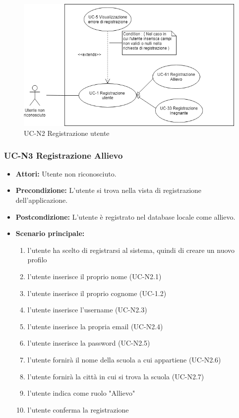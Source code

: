 \begin{figure}[h]
	\centering
	\includegraphics[scale=0.7]{images/UC-1.png}
	\caption{UC-N2 Registrazione utente}
\end{figure}

\subsubsection{UC-N3 Registrazione Allievo}
\begin{itemize}
	\item \textbf{Attori: }Utente non riconosciuto.
	\item \textbf{Precondizione: }L'utente si trova nella vista di registrazione dell'applicazione.
	\item \textbf{Postcondizione: }L'utente è registrato nel database locale come allievo.
	\item \textbf{Scenario principale: }
		\begin{enumerate}
		\item l'utente ha scelto di registrarsi al sistema, quindi di creare un nuovo profilo
		\item l'utente inserisce il proprio nome (UC-N2.1)
		\item l'utente inserisce il proprio cognome (UC-1.2)
		\item l'utente inserisce l'username (UC-N2.3)
		\item l'utente inserisce la propria email (UC-N2.4)
		\item l'utente inserisce la password (UC-N2.5)
		\item l'utente fornirà il nome della scuola a cui appartiene (UC-N2.6)
		\item l'utente fornirà la città in cui si trova la scuola (UC-N2.7)
		\item l'utente indica come ruolo "Allievo"
		\item l'utente conferma la registrazione
		\end{enumerate}
\end{itemize}

